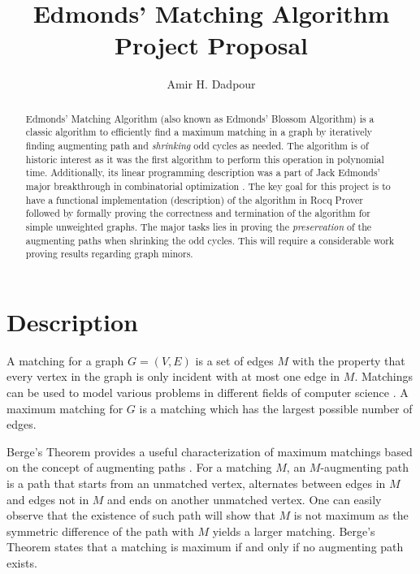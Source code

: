 \documentclass[acmsmall, screen, nonacm]{acmart}
\begin{document}
\title{Edmonds' Matching Algorithm Project Proposal}
\author{Amir H. Dadpour}


\begin{abstract}
	Edmonds' Matching Algorithm (also known as Edmonds' Blossom Algorithm) \cite{Edmonds1965} is a classic algorithm to efficiently find a maximum matching in a graph by iteratively finding augmenting path and \textit{shrinking} odd cycles as needed. The algorithm is of historic interest as it was the first algorithm to perform this operation in polynomial time. Additionally, its linear programming description was a part of Jack Edmonds' major breakthrough in combinatorial optimization \cite{Edmonds1965MA}.
	The key goal for this project is to have a functional implementation (description) of the algorithm in Rocq Prover followed by formally proving the correctness and termination of the algorithm for simple unweighted graphs. The major tasks lies in proving the \textit{preservation} of the augmenting paths when shrinking the odd cycles. This will require a considerable work proving results regarding graph minors.
\end{abstract}


\maketitle

\section{Description}

A matching for a graph $G=(V,E)$ is a set of edges $M$ with the property that every vertex in the graph is only incident with at most one edge in $M$. Matchings can be used to model various problems in different fields of computer science \cite{Bunke2000}. A maximum matching for $G$ is a matching which has the largest possible number of edges. 

Berge's Theorem provides a useful characterization of maximum matchings based on the concept of augmenting paths \cite{Berge1957}. For a matching $M$, an $M$-augmenting path is a path that starts from an unmatched vertex, alternates between edges in $M$ and edges not in $M$ and ends on another unmatched vertex. One can easily observe that the existence of such path will show that $M$ is not maximum as the symmetric difference of the path with $M$ yields a larger matching. Berge's Theorem states that a matching is maximum if and only if no augmenting path exists.
\end{document}
